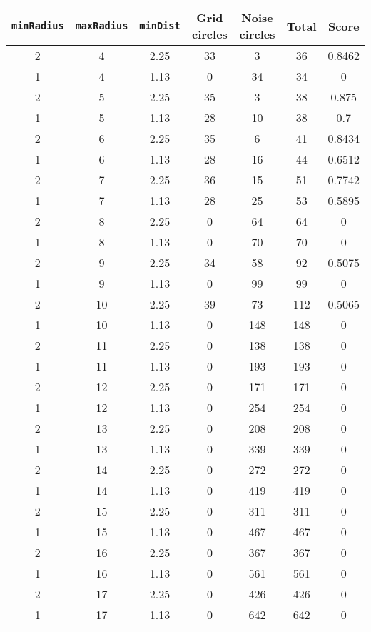 \documentclass[letterpaper, 12pt]{article}
\begin{document}
\begin{longtable}{|c|c|c|c|c|c|c|}
\hline
\textbf{\texttt{minRadius}} & \textbf{\texttt{maxRadius}} & \textbf{\texttt{minDist}} & \textbf{Grid circles} & \textbf{Noise circles} & \textbf{Total} & \textbf{Score} \\
\hline
2 & 4 & 2.25 & 33 & 3 & 36 & 0.8462 \\
\hline
1 & 4 & 1.13 & 0 & 34 & 34 & 0 \\
\hline
2 & 5 & 2.25 & 35 & 3 & 38 & 0.875 \\
\hline
1 & 5 & 1.13 & 28 & 10 & 38 & 0.7 \\
\hline
2 & 6 & 2.25 & 35 & 6 & 41 & 0.8434 \\
\hline
1 & 6 & 1.13 & 28 & 16 & 44 & 0.6512 \\
\hline
2 & 7 & 2.25 & 36 & 15 & 51 & 0.7742 \\
\hline
1 & 7 & 1.13 & 28 & 25 & 53 & 0.5895 \\
\hline
2 & 8 & 2.25 & 0 & 64 & 64 & 0 \\
\hline
1 & 8 & 1.13 & 0 & 70 & 70 & 0 \\
\hline
2 & 9 & 2.25 & 34 & 58 & 92 & 0.5075 \\
\hline
1 & 9 & 1.13 & 0 & 99 & 99 & 0 \\
\hline
2 & 10 & 2.25 & 39 & 73 & 112 & 0.5065 \\
\hline
1 & 10 & 1.13 & 0 & 148 & 148 & 0 \\
\hline
2 & 11 & 2.25 & 0 & 138 & 138 & 0 \\
\hline
1 & 11 & 1.13 & 0 & 193 & 193 & 0 \\
\hline
2 & 12 & 2.25 & 0 & 171 & 171 & 0 \\
\hline
1 & 12 & 1.13 & 0 & 254 & 254 & 0 \\
\hline
2 & 13 & 2.25 & 0 & 208 & 208 & 0 \\
\hline
1 & 13 & 1.13 & 0 & 339 & 339 & 0 \\
\hline
2 & 14 & 2.25 & 0 & 272 & 272 & 0 \\
\hline
1 & 14 & 1.13 & 0 & 419 & 419 & 0 \\
\hline
2 & 15 & 2.25 & 0 & 311 & 311 & 0 \\
\hline
1 & 15 & 1.13 & 0 & 467 & 467 & 0 \\
\hline
2 & 16 & 2.25 & 0 & 367 & 367 & 0 \\
\hline
1 & 16 & 1.13 & 0 & 561 & 561 & 0 \\
\hline
2 & 17 & 2.25 & 0 & 426 & 426 & 0 \\
\hline
1 & 17 & 1.13 & 0 & 642 & 642 & 0 \\

\end{longtable}
\end{document}
